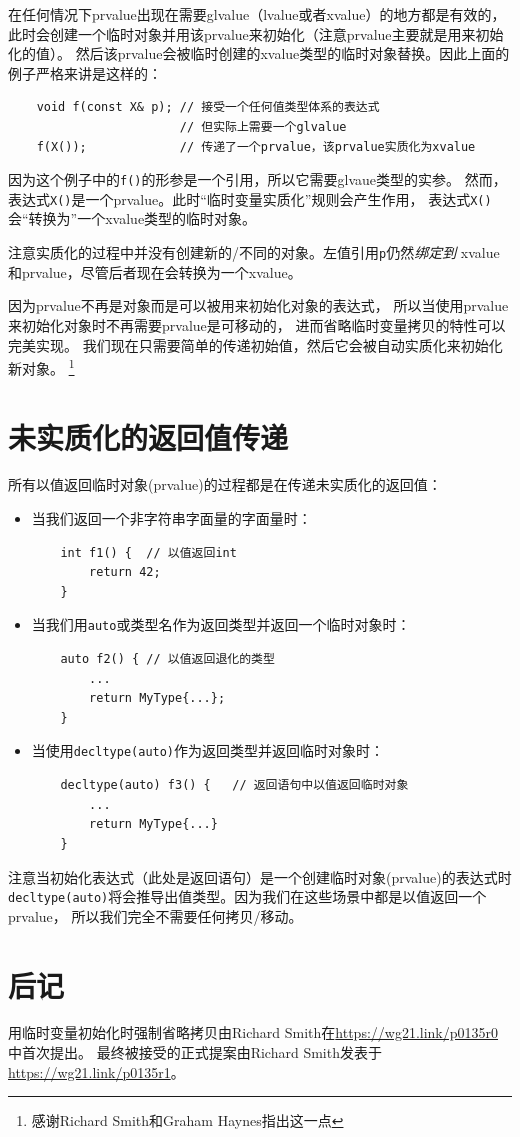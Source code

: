在任何情况下prvalue出现在需要glvalue（lvalue或者xvalue）的地方都是有效的，
此时会创建一个临时对象并用该prvalue来初始化（注意prvalue主要就是用来初始化的值）。
然后该prvalue会被临时创建的xvalue类型的临时对象替换。因此上面的例子严格来讲是这样的：
\begin{lstlisting}
    void f(const X& p); // 接受一个任何值类型体系的表达式
                        // 但实际上需要一个glvalue
    f(X());             // 传递了一个prvalue，该prvalue实质化为xvalue
\end{lstlisting}
因为这个例子中的\texttt{f()}的形参是一个引用，所以它需要glvaue类型的实参。
然而，表达式\texttt{X()}是一个prvalue。此时“临时变量实质化”规则会产生作用，
表达式\texttt{X()}会“转换为”一个xvalue类型的临时对象。

注意实质化的过程中并没有创建新的/不同的对象。左值引用\texttt{p}仍然\emph{绑定到}
xvalue和prvalue，尽管后者现在会转换为一个xvalue。

因为prvalue不再是对象而是可以被用来初始化对象的表达式，
所以当使用prvalue来初始化对象时不再需要prvalue是可移动的，
进而省略临时变量拷贝的特性可以完美实现。
我们现在只需要简单的传递初始值，然后它会被自动实质化来初始化新对象。
\footnote{感谢Richard Smith和Graham Haynes指出这一点}

\section{未实质化的返回值传递}
所有以值返回临时对象(prvalue)的过程都是在传递未实质化的返回值：
\begin{itemize}
    \item 当我们返回一个非字符串字面量的字面量时：
    \begin{lstlisting}
    int f1() {  // 以值返回int
        return 42;
    }
    \end{lstlisting}
    \item 当我们用\texttt{auto}或类型名作为返回类型并返回一个临时对象时：
    \begin{lstlisting}
    auto f2() { // 以值返回退化的类型
        ...
        return MyType{...};
    }
    \end{lstlisting}
    \item 当使用\texttt{decltype(auto)}作为返回类型并返回临时对象时：
    \begin{lstlisting}
    decltype(auto) f3() {   // 返回语句中以值返回临时对象
        ...
        return MyType{...}
    }
    \end{lstlisting}
\end{itemize}

注意当初始化表达式（此处是返回语句）是一个创建临时对象(prvalue)的表达式时
\texttt{decltype(auto)}将会推导出值类型。因为我们在这些场景中都是以值返回一个prvalue，
所以我们完全不需要任何拷贝/移动。

\section{后记}
用临时变量初始化时强制省略拷贝由Richard Smith在\url{https://wg21.link/p0135r0}中首次提出。
最终被接受的正式提案由Richard Smith发表于\url{https://wg21.link/p0135r1}。
